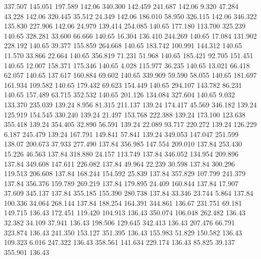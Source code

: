  337.507  145.051  197.589       142.06
 340.300  142.459  241.687       142.06
   9.320   47.284   43.228       142.06
 320.445   35.512   24.349       142.06
 186.010   58.950  326.115       142.06
 346.322  135.830  227.906       142.06
  24.979  139.414  254.085       140.65
 177.180  113.700  325.239       140.65
 328.281   33.600   66.666       140.65
  16.304  136.410  244.269       140.65
  17.084  131.902  228.192       140.65
  39.377  155.859  264.668       140.65
 183.742  100.991  144.312       140.65
  11.570   33.866   22.664       140.65
 356.819   71.231   51.968       140.65
 185.421   92.705  151.451       140.65
  12.007  158.371  175.346       140.65
   4.028  115.977   36.235       140.65
  13.021   66.418   62.057       140.65
 137.617  160.884   69.602       140.65
 339.909   59.590   58.055       140.65
 181.697  161.934  109.582       140.65
 179.432   69.623  154.449       140.65
 294.107  143.782   86.231       140.65
 157.489   63.715  352.532       140.65
 201.126  134.084  327.604       140.65
   9.032  133.370  235.039       139.24
   8.956   81.315  211.137       139.24
 174.417   45.569  346.182       139.24
 125.919  154.545  330.240       139.24
  21.497  153.768  222.388       139.24
 173.100  123.638  355.418       139.24
 354.405   32.890   56.591       139.24
  22.089   93.717  220.272       139.24
 126.229    6.187  245.479       139.24
 167.791  149.841   57.841       139.24
 349.053  147.047  251.599       138.07
 200.673   37.933  277.490       137.84
 356.985  147.554  209.010       137.84
 253.430   15.226   46.563       137.84
 318.880   24.157  113.749       137.84
 346.052  134.954  209.896       137.84
 349.608  147.611  226.082       137.84
  49.964   22.239   30.598       137.84
 300.296  119.513  206.608       137.84
 168.244  154.592   25.839       137.84
 357.829  107.799  241.379       137.84
 356.376  159.789  269.219       137.84
 179.895   24.409  160.844       137.84
  17.907   37.609  345.137       137.84
 355.185  155.390  280.738       137.84
  33.346   23.744    5.864       137.84
 100.336   34.064  268.144       137.84
 188.254  164.391  344.861       136.67
 231.751   69.181  149.715       136.43
 172.451  119.420  104.913       136.43
 350.074  106.048  262.482       136.43
  32.382   34.109   37.941       136.43
 198.506  129.645  342.413       136.43
 207.476   66.791  323.874       136.43
 241.350  153.127  351.395       136.43
 155.983   51.829  150.582       136.43
 109.323    6.016  247.322       136.43
 358.561  141.634  229.174       136.43
  85.825   39.137  355.901       136.43
